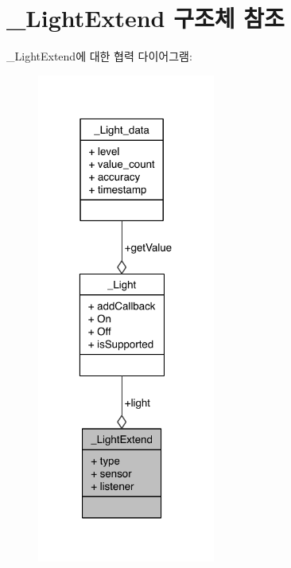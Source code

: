 \hypertarget{struct___light_extend}{\section{\-\_\-\-Light\-Extend 구조체 참조}
\label{struct___light_extend}
}


\-\_\-\-Light\-Extend에 대한 협력 다이어그램\-:\nopagebreak
\begin{figure}[H]
\begin{center}
\leavevmode
\includegraphics[width=166pt]{dc/d08/struct___light_extend__coll__graph}
\end{center}
\end{figure}
